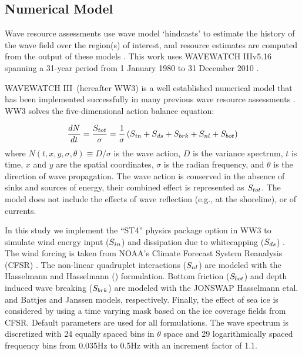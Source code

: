 \subsection{Numerical Model} \label{sec:method:model}

Wave resource assessments use wave model `hindcasts' to estimate the history of the wave field over the region(s) of interest, and resource estimates are computed from the output of these models \citep{internationalelectrotechnicalcommissionPart101Wave2015}. This work uses WAVEWATCH III\textregistered v5.16 spanning a 31-year period from 1 January 1980 to 31 December 2010 \citep{tolmanDistributedmemoryConceptsWave2002,tolmanwavewatch}.

WAVEWATCH III\textregistered \ (hereafter WW3) is a well established numerical model that has been implemented successfully in many previous wave resource assessments \citep[e.g.,][]{garcia-medinaWaveResourceAssessment2014,hemerRevisedAssessmentAustralia2017,yangWaveModelTest2017}.
WW3 solves the five-dimensional action balance equation:

\begin{align}
  \frac{d N}{d t} = \frac{S_{ tot }}{\sigma} = \frac{1}{\sigma}\left ( S_{ in } + S_{ ds } + S_{ brk } + S_{ nl } + S_{ bot } \right )
  \label{eqn:actionbalance}
\end{align}
where $N(t,x,y,\sigma,\theta) \equiv D/\sigma$ is the wave action, $D$ is the variance spectrum, $t$ is time, $x$ and $y$ are the spatial coordinates, $\sigma$ is the radian frequency, and $\theta$ is the direction of wave propagation.
The wave action is conserved in the absence of sinks and sources of energy, their combined effect is represented as $S_{ tot }$. The model does not include the effects of wave reflection (e.g., at the shoreline), or of currents.

In this study we implement the ``ST4'' physics package option in WW3 to simulate wind energy input ($S_{ in }$) and dissipation due to whitecapping ($S_{ ds }$) \citep{ardhuinObservationSwellDissipation2009}.
The wind forcing is taken from NOAA's Climate Forecast System Reanalysis (CFSR) \citep{sahaNCEPClimateForecast2010}. The non-linear quadruplet interactions ($S_{ nl }$) are modeled with the Hasselmann and Hasselmann (\citeyear{hasselmannComputationsParameterizationsNonlinear1985}) formulation. Bottom friction ($S_{ bot }$) and depth induced wave breaking ($S_{ brk }$) are modeled with the JONSWAP Hasselmann etal. \citeyear{hasselmannMeasurementsWindwaveGrowth1973} and Battjes and Janssen \citeyear{battjesEnergyLossSetup1978} models, respectively. Finally, the effect of sea ice is considered by using a time varying mask based on the ice coverage fields from CFSR. Default parameters are used for all formulations. The wave spectrum is discretized with 24 equally spaced bins in $\theta$ space and 29 logarithmically spaced frequency bins from 0.035Hz to 0.5Hz with an increment factor of 1.1.

